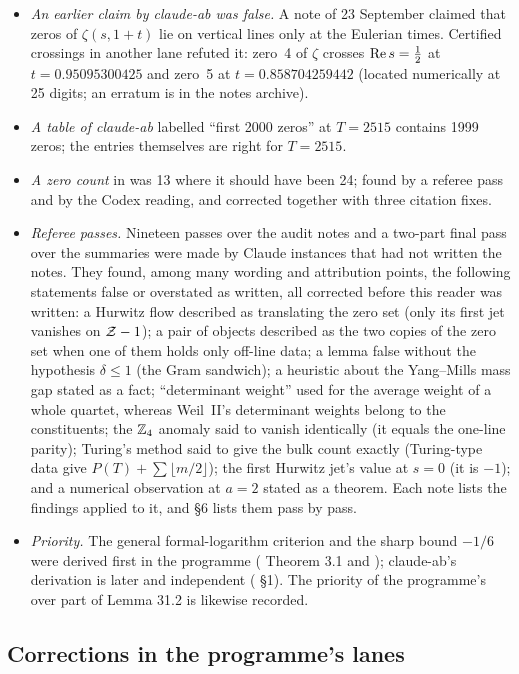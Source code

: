 \begin{itemize}
\item \emph{An earlier claim by claude-ab was false.} A note of 23 September claimed that zeros of $\zeta(s,1+t)$ lie on vertical lines only at the Eulerian times. Certified crossings in another lane refuted it: zero~4 of $\zeta$ crosses $\operatorname{Re} s=\tfrac12$ at $t=0.95095300425$ and zero~5 at $t=0.858704259442$ (located numerically at 25 digits; an erratum is in the notes archive).
\item \emph{A table of claude-ab} labelled ``first 2000 zeros'' at $T=2515$ contains 1999 zeros; the entries themselves are right for $T=2515$.
\item \emph{A zero count} in  was 13 where it should have been 24; found by a referee pass and by the Codex reading, and corrected together with three citation fixes.
\item \emph{Referee passes.} Nineteen passes over the audit notes and a two-part final pass over the summaries were made by Claude instances that had not written the notes. They found, among many wording and attribution points, the following statements false or overstated as written, all corrected before this reader was written: a Hurwitz flow described as translating the zero set (only its first jet vanishes on $\mathcal{Z}-1$); a pair of objects described as the two copies of the zero set when one of them holds only off-line data; a lemma false without the hypothesis $\delta\le1$ (the Gram sandwich); a heuristic about the Yang--Mills mass gap stated as a fact; ``determinant weight'' used for the average weight of a whole quartet, whereas Weil~II's determinant weights belong to the constituents; the $\mathbb{Z}_4$ anomaly said to vanish identically (it equals the one-line parity); Turing's method said to give the bulk count exactly (Turing-type data give $P(T)+\sum\lfloor m/2\rfloor$); the first Hurwitz jet's value at $s=0$ (it is $-1$); and a numerical observation at $a=2$ stated as a theorem. Each note lists the findings applied to it, and  §6 lists them pass by pass.
\item \emph{Priority.} The general formal-logarithm criterion and the sharp bound $-1/6$ were derived first in the programme ( Theorem 3.1 and ); claude-ab's derivation is later and independent ( §1). The priority of the programme's  over part of  Lemma 31.2 is likewise recorded.
\end{itemize}

\subsection{Corrections in the programme's lanes}

